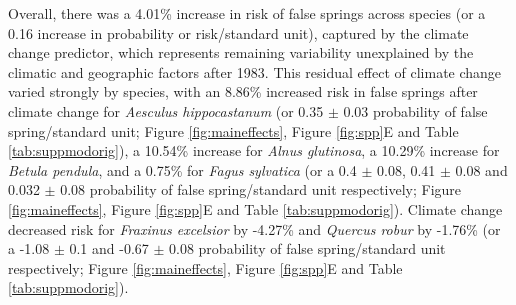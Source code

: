 \documentclass{article}\usepackage[]{graphicx}\usepackage[]{color}
\begin{document}
Overall, there was a 4.01\% increase in risk of false springs across species (or a 0.16 increase in probability or risk/standard unit), captured by the climate change predictor, which represents remaining variability unexplained by the climatic and geographic factors after 1983. This residual effect of climate change varied strongly by species, with an 8.86\% increased risk in false springs after climate change for \textit{Aesculus hippocastanum} (or 0.35 $\pm$ 0.03 probability of false spring/standard unit; Figure \ref{fig:maineffects}, Figure \ref{fig:spp}E and Table \ref{tab:suppmodorig}), a 10.54\% increase for \textit{Alnus glutinosa}, a 10.29\% increase for \textit{Betula pendula}, and a 0.75\% for \textit{Fagus sylvatica} (or a 0.4 $\pm$ 0.08, 0.41 $\pm$ 0.08 and 0.032 $\pm$ 0.08 probability of false spring/standard unit respectively; Figure \ref{fig:maineffects}, Figure \ref{fig:spp}E and Table \ref{tab:suppmodorig}). Climate change decreased risk for \textit{Fraxinus excelsior} by -4.27\% and \textit{Quercus robur} by -1.76\% (or a -1.08 $\pm$ 0.1 and -0.67 $\pm$ 0.08 probability of false spring/standard unit respectively; Figure \ref{fig:maineffects}, Figure \ref{fig:spp}E and Table \ref{tab:suppmodorig}). %

\end{document}
